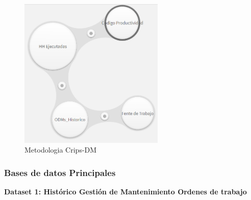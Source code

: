 \documentclass[
  11pt,
  bookmarksnumbered]{article}
\begin{document}
\begin{figure}

{\centering \includegraphics[width=2.72in]{media 2/image2} 

}

\caption{Metodologia Crips-DM}\label{fig:unnamed-chunk-5}
\end{figure}

\hypertarget{bases-de-datos-principales}{%
\subsubsection{Bases de datos Principales}\label{bases-de-datos-principales}}

\textbf{Dataset 1: Histórico Gestión de Mantenimiento Ordenes de trabajo}
\end{document}
